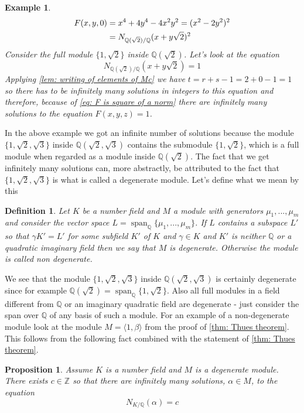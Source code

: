 \documentclass{article}
\newcommand{\Span}{\operatorname{span}}
\newtheorem{definition}{Definition}[section]
\newtheorem{proposition}{Proposition}[section]
\newtheorem{example}{Example}[section]
\newcommand{\mbb}[1]{\mathbb{#1}}
\numberwithin{equation}{section}
\begin{document}
\begin{example}
	\begin{align}\label{eq: F is square of a norm}
    	F(x,y,0) & = x^4 + 4y^4 - 4x^2y^2 = (x^2 - 2y^2)^2            	\\
             	& = N_{\mbb Q(\sqrt 2) / \mbb Q}(x + y \sqrt 2)^2 \notag
	\end{align}
	Consider the full module $\{1, \sqrt 2\}$ inside $\mbb Q(\sqrt 2)$. Let's look at the equation
	$$N_{\mbb Q(\sqrt 2) / \mbb Q}(x + y \sqrt 2) = 1$$
	Applying \cref{lem: writing of elements of Mc} we have $t = r+s -1 =  2 + 0 - 1 = 1$ so there has to be infinitely many solutions in integers to this equation and therefore, because of \cref{eq: F is square of a norm} there are infinitely many solutions to the equation $F(x, y, z) = 1$.
\end{example}
In the above example we got an infinite number of solutions because the module $\{1, \sqrt 2, \sqrt 3 \}$ inside $\mbb Q(\sqrt 2, \sqrt 3)$ contains the submodule $\{1, \sqrt 2\}$, which is a full module when regarded as a module inside $\mbb Q(\sqrt 2)$. The fact that we get infinitely many solutions can, more abstractly, be attributed to the fact that $\{1, \sqrt 2, \sqrt 3 \}$ is what is called a degenerate module. Let's define what we mean by this
\begin{definition}\label{def: Degenerate module}
	Let $K$ be a number field and $M$ a module with generators $\mu_1, ..., \mu_m$ and consider the vector space $L = \Span_{\mbb Q}\{\mu_1, ..., \mu_m \}$. If $L$ contains a subspace $L'$ so that $\gamma K' = L'$ for some subfield $K'$ of $K$ and $\gamma \in K$ and $K'$ is neither $\mbb Q$ or a quadratic imaginary field then we say that $M$ is degenerate. Otherwise the module is called non degenerate.
\end{definition}
We see that the module $\{1, \sqrt 2, \sqrt 3 \}$ inside $\mbb Q(\sqrt 2, \sqrt 3)$ is certainly degenerate since for example $\mbb Q(\sqrt 2) = \Span_{\mbb Q} \{1, \sqrt 2 \}$. Also all full modules in a field different from $\mbb Q$ or an imaginary quadratic field are degenerate - just consider the span over $\mbb Q$ of any basis of such a module. For an example of a non-degenerate module look at the module $M = \langle 1, \beta \rangle$ from the proof of \cref{thm: Thues theorem}. This follows from the following fact combined with the statement of \cref{thm: Thues theorem}.
\begin{proposition}
	Assume $K$ is a number field and $M$ is a degenerate module. There exists $c \in \mbb Z$ so that there are infinitely many solutions, $\alpha \in M$, to the equation
	$$N_{K / \mbb Q}(\alpha) = c$$
\end{proposition}
\end{document}
